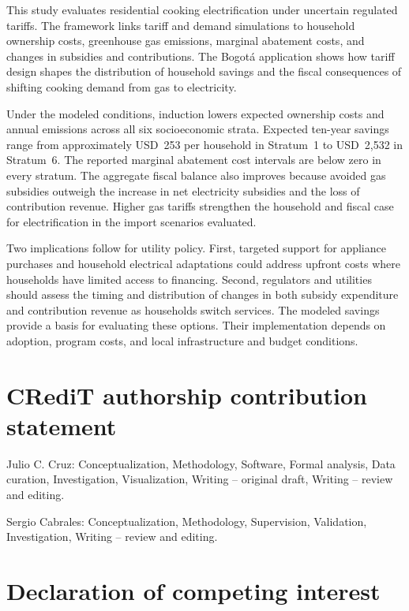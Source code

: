 \documentclass[authoryear,preprint,review,10pt]{elsarticle}
\begin{document}
This study evaluates residential cooking electrification under uncertain regulated tariffs. The framework links tariff and demand simulations to household ownership costs, greenhouse gas emissions, marginal abatement costs, and changes in subsidies and contributions. The Bogotá application shows how tariff design shapes the distribution of household savings and the fiscal consequences of shifting cooking demand from gas to electricity.

Under the modeled conditions, induction lowers expected ownership costs and annual emissions across all six socioeconomic strata. Expected ten-year savings range from approximately USD~253 per household in Stratum~1 to USD~2,532 in Stratum~6. The reported marginal abatement cost intervals are below zero in every stratum. The aggregate fiscal balance also improves because avoided gas subsidies outweigh the increase in net electricity subsidies and the loss of contribution revenue. Higher gas tariffs strengthen the household and fiscal case for electrification in the import scenarios evaluated.

Two implications follow for utility policy. First, targeted support for appliance purchases and household electrical adaptations could address upfront costs where households have limited access to financing. Second, regulators and utilities should assess the timing and distribution of changes in both subsidy expenditure and contribution revenue as households switch services. The modeled savings provide a basis for evaluating these options. Their implementation depends on adoption, program costs, and local infrastructure and budget conditions.

\section*{CRediT authorship contribution statement}

Julio C. Cruz: Conceptualization, Methodology, Software, Formal analysis,
Data curation, Investigation, Visualization, Writing -- original draft,
Writing -- review and editing.

Sergio Cabrales: Conceptualization, Methodology, Supervision, Validation,
Investigation, Writing -- review and editing.

\section*{Declaration of competing interest}
\end{document}
